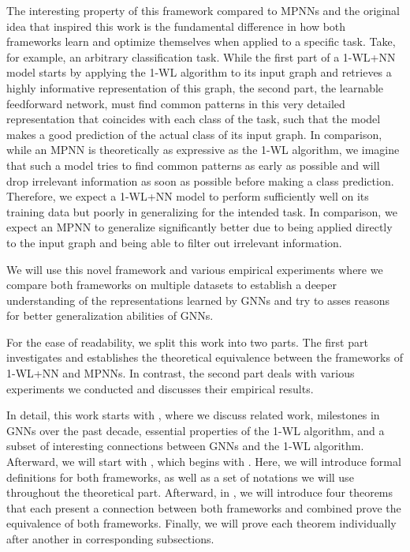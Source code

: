 The interesting property of this framework compared to MPNNs and the original idea that inspired this work is the fundamental difference in how both frameworks learn and optimize themselves when applied to a specific task. Take, for example, an arbitrary classification task. While the first part of a 1-WL+NN model starts by applying the 1-WL algorithm to its input graph and retrieves a highly informative representation of this graph, the second part, the learnable feedforward network, must find common patterns in this very detailed representation that coincides with each class of the task, such that the model makes a good prediction of the actual class of its input graph. In comparison, while an MPNN is theoretically as expressive as the 1-WL algorithm, we imagine that such a model tries to find common patterns as early as possible and will drop irrelevant information as soon as possible before making a class prediction. 
Therefore, we expect a 1-WL+NN model to perform sufficiently well on its training data but poorly in generalizing for the intended task. In comparison, we expect an MPNN to generalize significantly better due to being applied directly to the input graph and being able to filter out irrelevant information.

We will use this novel framework and various empirical experiments where we compare both frameworks on multiple datasets to establish a deeper understanding of the representations learned by GNNs and try to asses reasons for better generalization abilities of GNNs.

For the ease of readability, we split this work into two parts. The first part investigates and establishes the theoretical equivalence between the frameworks of 1-WL+NN and MPNNs. In contrast, the second part deals with various experiments we conducted and discusses their empirical results.

In detail, this work starts with , where we discuss related work, milestones in GNNs over the past decade, essential properties of the 1-WL algorithm, and a subset of interesting connections between GNNs and the 1-WL algorithm. Afterward, we will start with , which begins with . Here, we will introduce formal definitions for both frameworks, as well as a set of notations we will use throughout the theoretical part. Afterward, in , we will introduce four theorems that each present a connection between both frameworks and combined prove the equivalence of both frameworks. Finally, we will prove each theorem individually after another in corresponding subsections.

